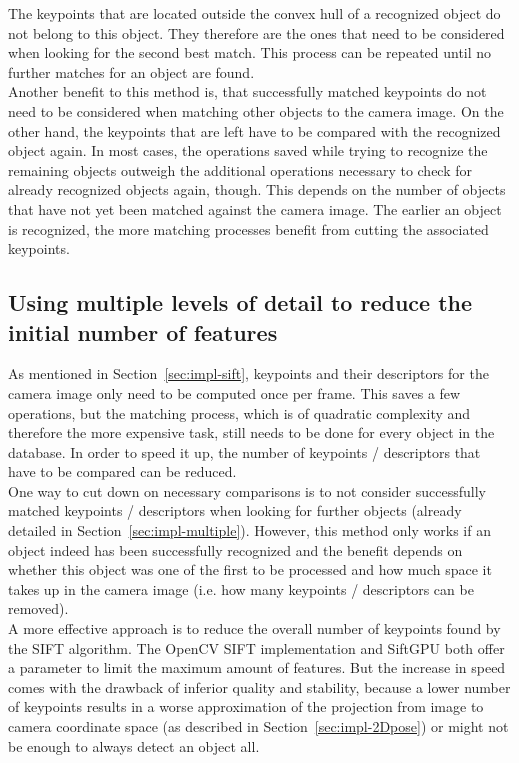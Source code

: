 The keypoints that are located outside the convex hull of a recognized object do not belong to this object. They therefore are the ones that need to be considered when looking for the second best match. This process can be repeated until no further matches for an object are found. \\

Another benefit to this method is, that successfully matched keypoints do not need to be considered when matching other objects to the camera image. On the other hand, the keypoints that are left have to be compared with the recognized object again. In most cases, the operations saved while trying to recognize the remaining objects outweigh the additional operations necessary to check for already recognized objects again, though. This depends on the number of objects that have not yet been matched against the camera image. The earlier an object is recognized, the more matching processes benefit from cutting the associated keypoints.

\subsection{Using multiple levels of detail to reduce the initial number of features}
\label{sec:impl-mipmap}
As mentioned in Section~\ref{sec:impl-sift}, keypoints and their descriptors for the camera image only need to be computed once per frame. This saves a few operations, but the matching process, which is of quadratic complexity and therefore the more expensive task, still needs to be done for every object in the database. In order to speed it up, the number of keypoints / descriptors that have to be compared can be reduced. \\

One way to cut down on necessary comparisons is to not consider successfully matched keypoints / descriptors when looking for further objects (already detailed in Section~\ref{sec:impl-multiple}). However, this method only works if an object indeed has been successfully recognized and the benefit depends on whether this object was one of the first to be processed and how much space it takes up in the camera image (i.e. how many keypoints / descriptors can be removed). \\

A more effective approach is to reduce the overall number of keypoints found by the SIFT algorithm. The OpenCV SIFT implementation and SiftGPU both offer a parameter to limit the maximum amount of features. But the increase in speed comes with the drawback of inferior quality and stability, because a lower number of keypoints results in a worse approximation of the projection from image to camera coordinate space (as described in Section~\ref{sec:impl-2Dpose}) or might not be enough to always detect an object all.

